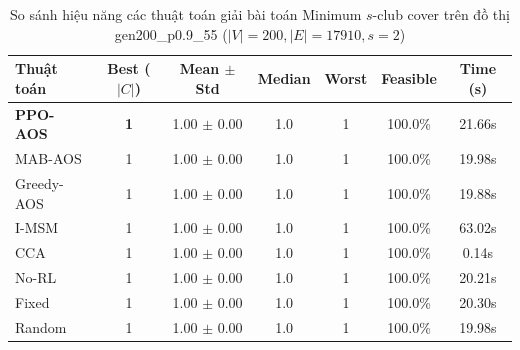 \begin{table}[htbp]
\centering
\caption{So sánh hiệu năng các thuật toán giải bài toán Minimum $s$-club cover trên đồ thị gen200_p0.9_55 ($|V|=200, |E|=17910, s=2$)}
\label{tab:results_gen200_p0_9_55}
\begin{tabular}{lcccccc}
\hline
\textbf{Thuật toán} & \textbf{Best ($|C|$)} & \textbf{Mean $\pm$ Std} & \textbf{Median} & \textbf{Worst} & \textbf{Feasible} & \textbf{Time (s)} \\
\hline
\textbf{PPO-AOS} & \textbf{1} & 1.00 $\pm$ 0.00 & 1.0 & 1 & 100.0\% & 21.66s \\
MAB-AOS & 1 & 1.00 $\pm$ 0.00 & 1.0 & 1 & 100.0\% & 19.98s \\
Greedy-AOS & 1 & 1.00 $\pm$ 0.00 & 1.0 & 1 & 100.0\% & 19.88s \\
I-MSM & 1 & 1.00 $\pm$ 0.00 & 1.0 & 1 & 100.0\% & 63.02s \\
CCA & 1 & 1.00 $\pm$ 0.00 & 1.0 & 1 & 100.0\% & 0.14s \\
No-RL & 1 & 1.00 $\pm$ 0.00 & 1.0 & 1 & 100.0\% & 20.21s \\
Fixed & 1 & 1.00 $\pm$ 0.00 & 1.0 & 1 & 100.0\% & 20.30s \\
Random & 1 & 1.00 $\pm$ 0.00 & 1.0 & 1 & 100.0\% & 19.98s \\
\hline
\end{tabular}
\end{table}
